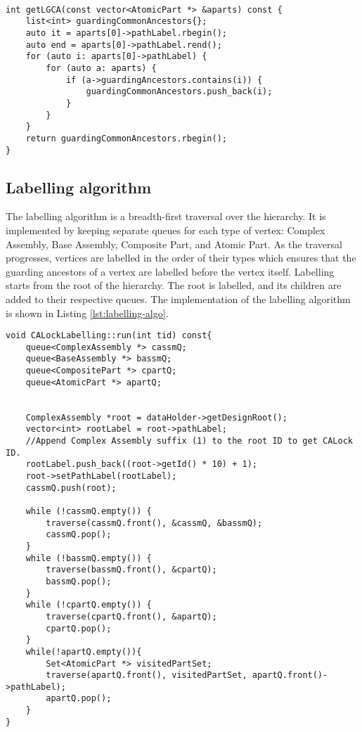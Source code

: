 \begin{lstlisting}[caption={Finging the LGCA of a set of atomic parts}]

int getLGCA(const vector<AtomicPart *> &aparts) const {
    list<int> guardingCommonAncestors{};
    auto it = aparts[0]->pathLabel.rbegin();
    auto end = aparts[0]->pathLabel.rend();
    for (auto i: aparts[0]->pathLabel) {
        for (auto a: aparts) {
            if (a->guardingAncestors.contains(i)) {
                guardingCommonAncestors.push_back(i);
            }
        }
    }
    return guardingCommonAncestors.rbegin();
}

\end{lstlisting}


\subsection{Labelling algorithm}

The labelling algorithm is a breadth-first traversal over the hierarchy. It is implemented by keeping separate queues for each type of vertex: Complex Assembly, Base Assembly, Composite Part, and Atomic Part. As the traversal progresses, vertices are labelled in the order of their types which ensures that the guarding ancestors of a vertex are labelled before the vertex itself.
Labelling starts from the root of the hierarchy. The root is labelled, and its children are added to their respective queues. The implementation of the labelling algorithm is shown in Listing \ref{lst:labelling-algo}.

\begin{lstlisting}[caption={BFS traversal for CALock labelling}, label={lst:labelling-algo}]
void CALockLabelling::run(int tid) const{
    queue<ComplexAssembly *> cassmQ;
    queue<BaseAssembly *> bassmQ;
    queue<CompositePart *> cpartQ;
    queue<AtomicPart *> apartQ;


    ComplexAssembly *root = dataHolder->getDesignRoot();
    vector<int> rootLabel = root->pathLabel;
    //Append Complex Assembly suffix (1) to the root ID to get CALock ID.
    rootLabel.push_back((root->getId() * 10) + 1);
    root->setPathLabel(rootLabel);
    cassmQ.push(root);

    while (!cassmQ.empty()) {
        traverse(cassmQ.front(), &cassmQ, &bassmQ);
        cassmQ.pop();
    }
    while (!bassmQ.empty()) {
        traverse(bassmQ.front(), &cpartQ);
        bassmQ.pop();
    }
    while (!cpartQ.empty()) {
        traverse(cpartQ.front(), &apartQ);
        cpartQ.pop();
    }
    while(!apartQ.empty()){
        Set<AtomicPart *> visitedPartSet;
        traverse(apartQ.front(), visitedPartSet, apartQ.front()->pathLabel);
        apartQ.pop();
    }
}

\end{lstlisting}

